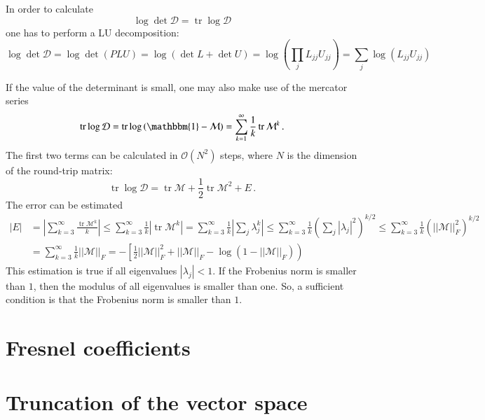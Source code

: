 \documentclass[superscriptaddress,prb]{revtex4-1}
\DeclareMathOperator{\trace}{tr}
\begin{document}
In order to calculate
\begin{equation}
\log\det\mathcal{D} = \trace\log\mathcal{D}
\end{equation}
one has to perform a LU decomposition:
\begin{equation}
\log\det\mathcal{D} = \log\det\left(PLU\right) = \log\left(\det L + \det U\right) = \log\left(\prod_j L_{jj} U_{jj}\right) = \sum_j \log\left(L_{jj} U_{jj}\right)
\end{equation}

If the value of the determinant is small, one may also make use of the mercator series
\begin{equation}
\trace\log \mathcal{D} = \trace\log\left(\mathbbm{1}-\mathcal{M}\right) = \sum_{k=1}^\infty \frac{1}{k} \trace\mathcal{M}^k \,.
\end{equation}
The first two terms can be calculated in $\mathcal{O}(N^2)$ steps, where $N$ is the dimension of the round-trip matrix:
\begin{equation}
\trace\log\mathcal{D} = \trace\mathcal{M} + \frac{1}{2} \trace\mathcal{M}^2 + E \,.
\end{equation}
The error can be estimated
\begin{align}
|E| &=  \left|\sum_{k=3}^\infty \frac{\trace\mathcal{M}^k}{k}\right|
\le \sum_{k=3}^\infty \frac{1}{k} \left| \trace\mathcal{M}^k \right|
= \sum_{k=3}^\infty \frac{1}{k} \left| \sum_j \lambda_j^k \right|
\le \sum_{k=3}^\infty \frac{1}{k} \left(\sum_j |\lambda_j|^2\right)^{k/2}
\le \sum_{k=3}^\infty \frac{1}{k} \left(||\mathcal{M}||_F^2\right)^{k/2} \\
&= \sum_{k=3}^\infty \frac{1}{k} ||\mathcal{M}||_F = -\left[\frac{1}{2}||\mathcal{M}||_F^2+||\mathcal{M}||_F -\log\left(1-||\mathcal{M}||_F\right)\right)
\end{align}
This estimation is true if all eigenvalues $|\lambda_j| < 1$. If the Frobenius
norm is smaller than $1$, then the modulus of all eigenvalues is smaller than
one. So, a sufficient condition is that the Frobenius norm is smaller than $1$.

\section{Fresnel coefficients}
\section{Truncation of the vector space}

\appendix
\end{document}
